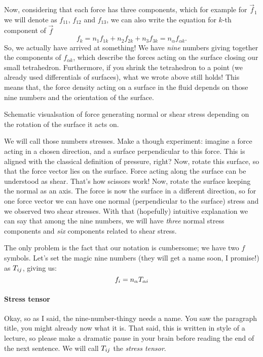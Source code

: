 \documentclass[justified, nobib]{tufte-handout}
\begin{document}
Now, considering that each force has three components, which for example for
\(\vec{f}_1\) we will denote as \(f_{11}\), \(f_{12}\) and \(f_{13}\), we can
also write the equation for \(k\)-th component of \(\vec{f}\)
\[
	f_k = n_1 f_{1k} + n_2 f_{2k} +n_3 f_{3k} = n_\alpha f_{\alpha k}.
\]
So, we actually have arrived at something! We have \emph{nine} numbers giving
together the components of \(f_{\alpha k}\), which describe the forces acting
on the surface closing our small tetrahedron. Furthermore, if you shrink the
tetrahedron to a point (we already used differentials of surfaces), what we
wrote above still holds! This means that, the force density acting on a surface
in the fluid depends on those nine numbers and the orientation of the surface.

\begin{marginfigure}
  
  \caption{Schematic visualsation of force generating normal or shear 
  stress depending on the rotation of the surface it acts on.}
  \label{fig:stress_visualisation}
\end{marginfigure}


We will call those numbers stresses. Make a though experiment: imagine a force
acting in a chosen direction, and a surface perpendicular to this force. This
is aligned with the classical definition of pressure, right? Now, rotate this
surface, so that the force vector lies on the surface. Force acting along the
surface can be understood as shear. That's how scissors work! Now, rotate the
surface keeping the normal as an axis. The force is now  the
surface in a different direction, so for one force vector we can have one normal
(perpendicular to the surface)
stress and we observed two shear stresses. With that (hopefully) intuitive
explanation we can say that among the nine numbers, we will have \emph{three}
normal stress components and \emph{six} components related to shear stress.

The only problem is the fact that our notation is cumbersome; we have two \(f\)
symbols. Let's set the magic nine numbers (they will get a name soon, I promise!)
as \(T_{ij}\), giving us:
\[
	f_i = n_\alpha T_{\alpha i}
\]

\paragraph{Stress tensor}
Okay, so as I said, the nine-number-thingy needs a name. You saw the paragraph
title, you might already now what it is. That said, this is written in style of
a lecture, so please make a dramatic pause in your brain before reading the end of the
next sentence. We will call \(T_{ij}\) the \emph{stress tensor}.
\end{document}

